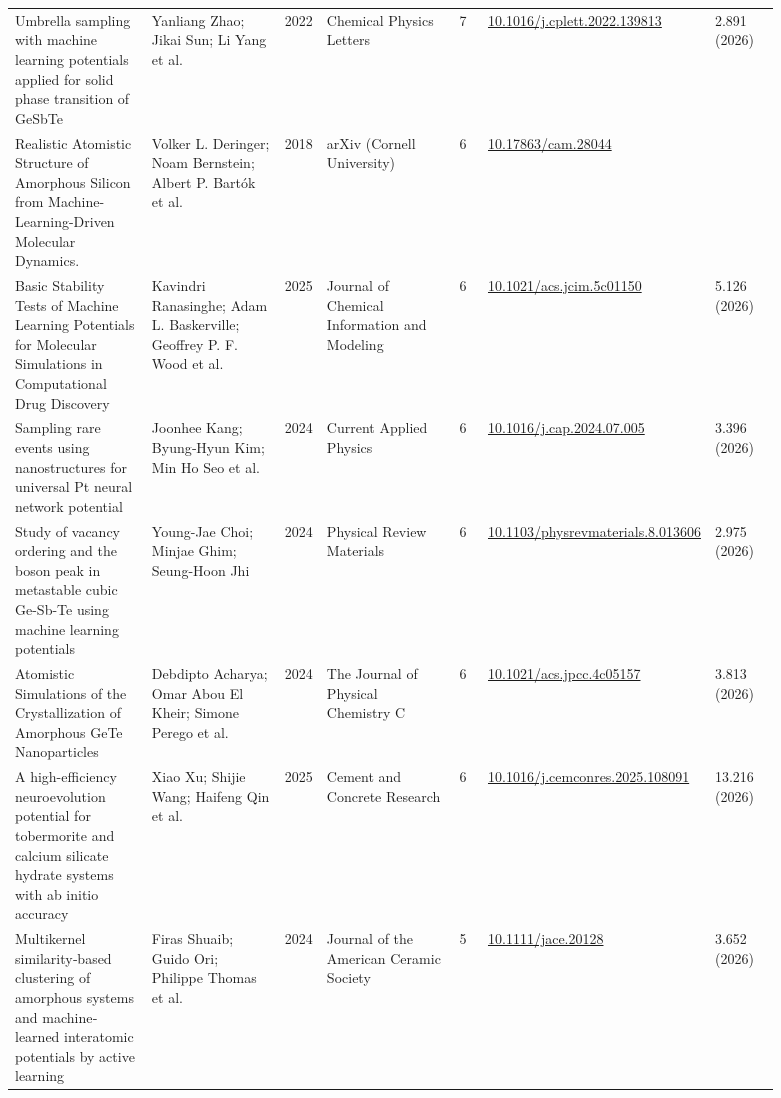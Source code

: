 \documentclass[10pt,a4paper]{article}
\begin{document}
{\begin{longtable}{p{0.192\linewidth}p{0.192\linewidth}p{0.043\linewidth}p{0.192\linewidth}p{0.043\linewidth}p{0.132\linewidth}p{0.096\linewidth}}
Umbrella sampling with machine learning potentials applied for solid phase transition of GeSbTe & Yanliang Zhao; Jikai Sun; Li Yang et al. & 2022 & Chemical Physics Letters & 7 & \href{https://doi.org/10.1016/j.cplett.2022.139813}{10.1016/j.cplett.2022.139813} & 2.891 (2026) \\
Realistic Atomistic Structure of Amorphous Silicon from Machine-Learning-Driven Molecular Dynamics. & Volker L. Deringer; Noam Bernstein; Albert P. Bartók et al. & 2018 & arXiv (Cornell University) & 6 & \href{https://doi.org/10.17863/cam.28044}{10.17863/cam.28044} &  \\
Basic Stability Tests of Machine Learning Potentials for Molecular Simulations in Computational Drug Discovery & Kavindri Ranasinghe; Adam L. Baskerville; Geoffrey P. F. Wood et al. & 2025 & Journal of Chemical Information and Modeling & 6 & \href{https://doi.org/10.1021/acs.jcim.5c01150}{10.1021/acs.jcim.5c01150} & 5.126 (2026) \\
Sampling rare events using nanostructures for universal Pt neural network potential & Joonhee Kang; Byung‐Hyun Kim; Min Ho Seo et al. & 2024 & Current Applied Physics & 6 & \href{https://doi.org/10.1016/j.cap.2024.07.005}{10.1016/j.cap.2024.07.005} & 3.396 (2026) \\
Study of vacancy ordering and the boson peak in metastable cubic Ge-Sb-Te using machine learning potentials & Young-Jae Choi; Minjae Ghim; Seung-Hoon Jhi & 2024 & Physical Review Materials & 6 & \href{https://doi.org/10.1103/physrevmaterials.8.013606}{10.1103/physrevmaterials.8.013606} & 2.975 (2026) \\
Atomistic Simulations of the Crystallization of Amorphous GeTe Nanoparticles & Debdipto Acharya; Omar Abou El Kheir; Simone Perego et al. & 2024 & The Journal of Physical Chemistry C & 6 & \href{https://doi.org/10.1021/acs.jpcc.4c05157}{10.1021/acs.jpcc.4c05157} & 3.813 (2026) \\
A high-efficiency neuroevolution potential for tobermorite and calcium silicate hydrate systems with ab initio accuracy & Xiao Xu; Shijie Wang; Haifeng Qin et al. & 2025 & Cement and Concrete Research & 6 & \href{https://doi.org/10.1016/j.cemconres.2025.108091}{10.1016/j.cemconres.2025.108091} & 13.216 (2026) \\
Multikernel similarity‐based clustering of amorphous systems and machine‐learned interatomic potentials by active learning & Firas Shuaib; Guido Ori; Philippe Thomas et al. & 2024 & Journal of the American Ceramic Society & 5 & \href{https://doi.org/10.1111/jace.20128}{10.1111/jace.20128} & 3.652 (2026) \\

\end{longtable}}
\end{document}
